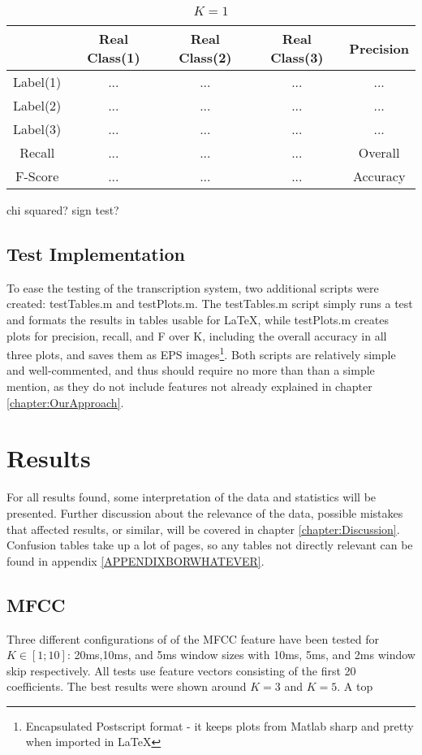			\begin{table}
				\centering
				\begin{tabular}{|c | c | c | c | c |}
					\hline
					 & Real Class(1) & Real Class(2) & Real Class(3) & Precision\\ \hline
					Label(1)  & ... & ... & ... & ...\\ \hline
					Label(2)  & ... & ... & ... & ...\\ \hline
					Label(3) & ... & ... & ... & ...\\ \hline
					Recall   & ... & ... & ... & \multicolumn{1}{c}{Overall}\\ \cline{1-4}
					F-Score & ... & ... & ... & \multicolumn{1}{c}{Accuracy} \\ \cline{1-4}
				\end{tabular}
				\caption{$K=1$}
				\label{table:eval:explanatory}
			\end{table}
		chi squared?
		sign test?
		
		
	\subsection{Test Implementation}		%
		To ease the testing of the transcription system, two additional scripts were created: testTables.m and testPlots.m.
		The testTables.m script simply runs a test and formats the results in tables usable for \LaTeX, while testPlots.m creates plots for precision, recall, and F over K, including the overall accuracy in all three plots, and saves them as EPS images\footnote{Encapsulated Postscript format - it keeps plots from Matlab sharp and pretty when imported in \LaTeX}. Both scripts are relatively simple and well-commented, and thus should require no more than than a simple mention, as they do not include features not already explained in chapter \ref{chapter:OurApproach}.
			
 
\section{Results}
For all results found, some interpretation of the data and statistics will be presented. Further discussion about the relevance of the data, possible mistakes that affected results, or similar, will be covered in chapter \ref{chapter:Discussion}. 
Confusion tables take up a lot of pages, so any tables not directly relevant can be found in appendix \ref{APPENDIXBORWHATEVER}.


	\subsection{MFCC}
		
		
		Three different configurations of of the MFCC feature have been tested for $K \in [1;10]$: 20ms,10ms, and 5ms window sizes with 10ms, 5ms, and 2ms window skip respectively. All tests use feature vectors consisting of the first 20 coefficients. 
		The best results were shown around $K=3$ and $K=5$. A top 
		

		
		
			
	